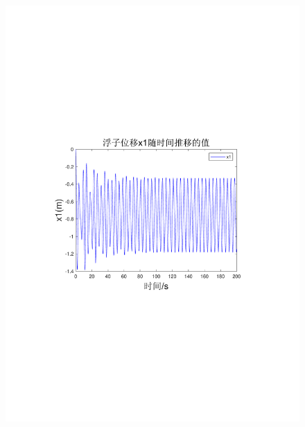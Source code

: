 \documentclass[12pt,utf8]{article}
\begin{document}
\begin{figure}[htbp]
	\centering
	\begin{minipage}{0.45\linewidth}
		\includegraphics[width=0.9\linewidth]{figures/T1-1浮子位移x1.pdf}
		\label{chutian1}%
	\end{minipage}
	\begin{minipage}{0.45\linewidth}

\end{minipage}
\end{figure}
\end{document}

